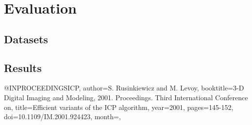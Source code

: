 \chapter{Evaluation}

\section{Datasets}

\section{Results}

@INPROCEEDINGS{ICP, 
author={S. Rusinkiewicz and M. Levoy}, 
booktitle={3-D Digital Imaging and Modeling, 2001. Proceedings. Third International Conference on}, 
title={Efficient variants of the ICP algorithm}, 
year={2001}, 
pages={145-152}, 
doi={10.1109/IM.2001.924423}, 
month={},}